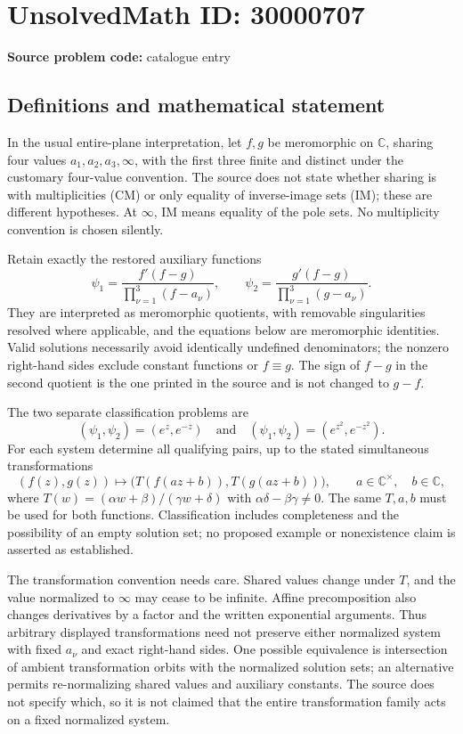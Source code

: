 \documentclass[11pt]{article}
\newcommand{\C}{\mathbb{C}}
\begin{document}
\section*{UnsolvedMath ID: 30000707}
\textbf{Source problem code:} catalogue entry
\subsection{Definitions and mathematical statement}
In the usual entire-plane interpretation, let \(f,g\) be meromorphic on \(\C\), sharing four values \(a_1,a_2,a_3,\infty\), with the first three finite and distinct under the customary four-value convention. The source does not state whether sharing is with multiplicities (CM) or only equality of inverse-image sets (IM); these are different hypotheses. At \(\infty\), IM means equality of the pole sets. No multiplicity convention is chosen silently.

Retain exactly the restored auxiliary functions
\[
 \psi_1=\frac{f'(f-g)}{\prod_{\nu=1}^3(f-a_\nu)},\qquad
 \psi_2=\frac{g'(f-g)}{\prod_{\nu=1}^3(g-a_\nu)}.
\]
They are interpreted as meromorphic quotients, with removable singularities resolved where applicable, and the equations below are meromorphic identities. Valid solutions necessarily avoid identically undefined denominators; the nonzero right-hand sides exclude constant functions or \(f\equiv g\). The sign of \(f-g\) in the second quotient is the one printed in the source and is not changed to \(g-f\).

The two separate classification problems are
\[
 (\psi_1,\psi_2)=(e^z,e^{-z})
 \quad\text{and}\quad
 (\psi_1,\psi_2)=(e^{z^2},e^{-z^2}).
\]
For each system determine all qualifying pairs, up to the stated simultaneous transformations
\[
 (f(z),g(z))\longmapsto
 \bigl(T(f(az+b)),T(g(az+b))\bigr),
 \qquad a\in\C^\times,\quad b\in\C,
\]
where \(T(w)=(\alpha w+\beta)/(\gamma w+\delta)\) with \(\alpha\delta-\beta\gamma\ne0\). The same \(T,a,b\) must be used for both functions. Classification includes completeness and the possibility of an empty solution set; no proposed example or nonexistence claim is asserted as established.

The transformation convention needs care. Shared values change under \(T\), and the value normalized to \(\infty\) may cease to be infinite. Affine precomposition also changes derivatives by a factor and the written exponential arguments. Thus arbitrary displayed transformations need not preserve either normalized system with fixed \(a_\nu\) and exact right-hand sides. One possible equivalence is intersection of ambient transformation orbits with the normalized solution sets; an alternative permits re-normalizing shared values and auxiliary constants. The source does not specify which, so it is not claimed that the entire transformation family acts on a fixed normalized system.
\end{document}
